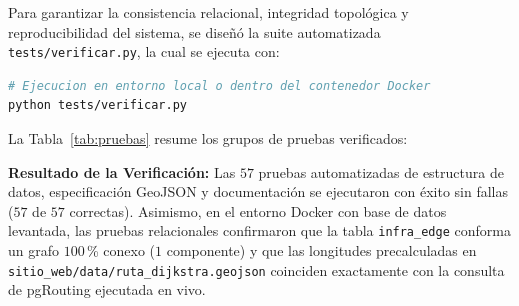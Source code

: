 \documentclass[letterpaper,12pt]{article}
\begin{document}
Para garantizar la consistencia relacional, integridad topológica y reproducibilidad del sistema, se diseñó la suite automatizada \texttt{tests/verificar.py}, la cual se ejecuta con:
\begin{lstlisting}[language=bash]
# Ejecucion en entorno local o dentro del contenedor Docker
python tests/verificar.py
\end{lstlisting}

La Tabla~\ref{tab:pruebas} resume los grupos de pruebas verificados:

\begin{table}[H]
\centering
\small
\caption{Suite de pruebas automatizadas implementada en \texttt{tests/verificar.py}.}
\label{tab:pruebas}
\end{table}

\noindent \textbf{Resultado de la Verificación:} Las $57$ pruebas automatizadas de estructura de datos, especificación GeoJSON y documentación se ejecutaron con éxito sin fallas ($57$ de $57$ correctas). Asimismo, en el entorno Docker con base de datos levantada, las pruebas relacionales confirmaron que la tabla \texttt{infra\_edge} conforma un grafo $100$\,\% conexo ($1$ componente) y que las longitudes precalculadas en \texttt{sitio\_web/data/ruta\_dijkstra.geojson} coinciden exactamente con la consulta de pgRouting ejecutada en vivo.
\end{document}
